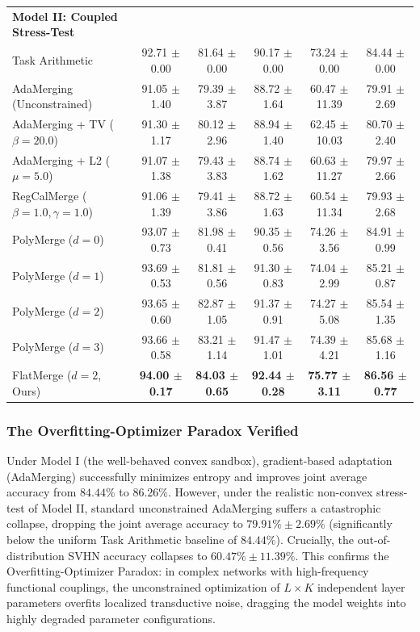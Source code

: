 \begin{table}[t]
\begin{center}
\begin{small}
\begin{sc}
\begin{tabular}{lccccc}
\midrule
\textbf{Model II: Coupled Stress-Test} & & & & & \\
Task Arithmetic & 92.71 $\pm$ 0.00 & 81.64 $\pm$ 0.00 & 90.17 $\pm$ 0.00 & 73.24 $\pm$ 0.00 & 84.44 $\pm$ 0.00 \\
AdaMerging (Unconstrained) & 91.05 $\pm$ 1.40 & 79.39 $\pm$ 3.87 & 88.72 $\pm$ 1.64 & 60.47 $\pm$ 11.39 & 79.91 $\pm$ 2.69 \\
AdaMerging + TV ($\beta=20.0$) & 91.30 $\pm$ 1.17 & 80.12 $\pm$ 2.96 & 88.94 $\pm$ 1.40 & 62.45 $\pm$ 10.03 & 80.70 $\pm$ 2.40 \\
AdaMerging + L2 ($\mu=5.0$) & 91.07 $\pm$ 1.38 & 79.43 $\pm$ 3.83 & 88.74 $\pm$ 1.62 & 60.63 $\pm$ 11.27 & 79.97 $\pm$ 2.66 \\
RegCalMerge ($\beta=1.0, \gamma=1.0$) & 91.06 $\pm$ 1.39 & 79.41 $\pm$ 3.86 & 88.72 $\pm$ 1.63 & 60.54 $\pm$ 11.34 & 79.93 $\pm$ 2.68 \\
PolyMerge ($d=0$) & 93.07 $\pm$ 0.73 & 81.98 $\pm$ 0.41 & 90.35 $\pm$ 0.56 & 74.26 $\pm$ 3.56 & 84.91 $\pm$ 0.99 \\
PolyMerge ($d=1$) & 93.69 $\pm$ 0.53 & 81.81 $\pm$ 0.56 & 91.30 $\pm$ 0.83 & 74.04 $\pm$ 2.99 & 85.21 $\pm$ 0.87 \\
PolyMerge ($d=2$) & 93.65 $\pm$ 0.60 & 82.87 $\pm$ 1.05 & 91.37 $\pm$ 0.91 & 74.27 $\pm$ 5.08 & 85.54 $\pm$ 1.35 \\
PolyMerge ($d=3$) & 93.66 $\pm$ 0.58 & 83.21 $\pm$ 1.14 & 91.47 $\pm$ 1.01 & 74.39 $\pm$ 4.21 & 85.68 $\pm$ 1.16 \\
FlatMerge ($d=2$, Ours) & \textbf{94.00 $\pm$ 0.17} & \textbf{84.03 $\pm$ 0.65} & \textbf{92.44 $\pm$ 0.28} & \textbf{75.77 $\pm$ 3.11} & \textbf{86.56 $\pm$ 0.77} \\
\bottomrule
\end{tabular}
\end{sc}
\end{small}
\end{center}
\vskip -0.1in
\end{table}

\subsubsection{The Overfitting-Optimizer Paradox Verified}
Under Model I (the well-behaved convex sandbox), gradient-based adaptation (AdaMerging) successfully minimizes entropy and improves joint average accuracy from $84.44\%$ to $86.26\%$. 
However, under the realistic non-convex stress-test of Model II, standard unconstrained AdaMerging suffers a catastrophic collapse, dropping the joint average accuracy to $79.91\% \pm 2.69\%$ (significantly below the uniform Task Arithmetic baseline of $84.44\%$). 
Crucially, the out-of-distribution SVHN accuracy collapses to $60.47\% \pm 11.39\%$. 
This confirms the Overfitting-Optimizer Paradox: in complex networks with high-frequency functional couplings, the unconstrained optimization of $L \times K$ independent layer parameters overfits localized transductive noise, dragging the model weights into highly degraded parameter configurations.

